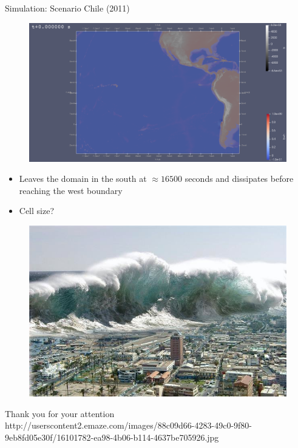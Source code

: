 \documentclass[shortpres]{beamer}
\newcommand{\imgfullscale}{0.75}
\begin{document}
\begin{frame}{Simulation: Scenario Chile (2011)}
	\begin{figure}
		\includegraphics[width=0.6\linewidth]{img/chile_initial.png}
	\end{figure}
	\begin{itemize}
		\item Leaves the domain in the south at $\approx 16500$ seconds and dissipates before reaching the west boundary
		\item Cell size?
	\end{itemize}
\end{frame}	
	
\begin{frame}{}
	\begin{figure}
		\includegraphics[clip, width=\imgfullscale\linewidth]{img/tsunami.jpg}
	\end{figure}
	\centering
	Thank you for your attention
	\\
	\vfill
	\flushleft
	{\fontsize{5}{5} \selectfont http://userscontent2.emaze.com/images/88c09d66-4283-49c0-9f80-9eb8fd05e30f/16101782-ea98-4b06-b114-4637be705926.jpg}
\end{frame}
\end{document}
